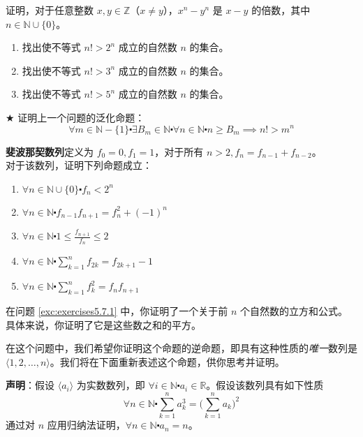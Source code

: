 \begin{exercise}
    证明，对于任意整数 $x,y \in \mathbb{Z}$（$x \ne y$），$x^n-y^n$ 是 $x-y$ 的倍数，其中 $n \in \mathbb{N} \cup \{0\}$。
\end{exercise}

\begin{exercise}
    \begin{enumerate}[label=(\alph*)]
        \item 找出使不等式 $n! > 2^n$ 成立的自然数 $n$ 的集合。
        \item 找出使不等式 $n! > 3^n$ 成立的自然数 $n$ 的集合。
        \item 找出使不等式 $n! > 5^n$ 成立的自然数 $n$ 的集合。
    \end{enumerate}
\end{exercise}

\begin{exercise}
    $\bigstar$ 证明上一个问题的泛化命题：
    \[\forall m \in \mathbb{N} - \{1\} \centerdot \exists B_m \in \mathbb{N} \centerdot \forall n \in \mathbb{N} \centerdot n \ge B_m \implies n! > m^n\]
\end{exercise}

\begin{exercise}
    \textbf{斐波那契数列}定义为 $f_0=0, f_1=1$，对于所有 $n >2, f_n = f_{n-1}+f_{n-2}$。\\
    对于该数列，证明下列命题成立：
    \begin{enumerate}[label=(\alph*)]
        \item $\forall n \in \mathbb{N} \cup \{0\} \centerdot f_n < 2^n$
        \item $\forall n \in \mathbb{N} \centerdot f_{n-1}f_{n+1} = f_n^2+(-1)^n$
        \item $\forall n \in \mathbb{N} \centerdot 1 \le \frac{f_{n+1}}{f_n} \le 2$
        \item $\forall n \in \mathbb{N} \centerdot \sum_{k=1}^{n} f_{2k}= f_{2k+1}-1$
        \item $\forall n \in \mathbb{N} \centerdot \sum_{k=1}^{n} f_k^2= f_{n}f_{n+1}$
    \end{enumerate}
\end{exercise}

\begin{exercise}\label{exc:exercises5.7.15}
    在问题 \ref{exc:exercises5.7.1} 中，你证明了一个关于前 $n$ 个自然数的立方和公式。具体来说，你证明了它是这些数之和的平方。
    
    在这个问题中，我们希望你证明这个命题的逆命题，即具有这种性质的\emph{唯一}数列是 $\langle 1, 2, \dots, n \rangle$。我们将在下面重新表述这个命题，供你思考并证明。

    \textbf{声明}：假设 $\langle a_i \rangle$ 为实数数列，即 $\forall i \in \mathbb{N} \centerdot a_i \in \mathbb{R}$。假设该数列具有如下性质
    \[\forall n \in \mathbb{N} \centerdot \sum_{k=1}^{n} a_k^3 = \bigg(\sum_{k=1}^{n} a_k\bigg)^2\]
    通过对 $n$ 应用归纳法证明，$\forall n \in \mathbb{N} \centerdot a_n = n$。
\end{exercise}

